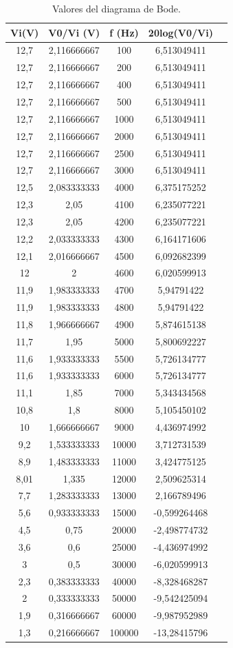 \documentclass[paper=a4, fontsize=11pt]{scrartcl} %
\numberwithin{equation}{section} %
\numberwithin{figure}{section} %
\numberwithin{table}{section} %
\begin{document}
\begin{table}[H]
	\centering
	\begin{tabular}{|c|c|c|c|c|}
		\hline
		\textbf{Vi(V)} & \textbf{V0/Vi (V)} & \textbf{f (Hz)} & \textbf{20log(V0/Vi)} \\
		\hline 
		12,7&2,116666667&100&6,513049411\\
		12,7&2,116666667&200&6,513049411\\
		12,7&2,116666667&400&6,513049411\\
		12,7&2,116666667&500&6,513049411\\
		12,7&2,116666667&1000&6,513049411\\
		12,7&2,116666667&2000&6,513049411\\
		12,7&2,116666667&2500&6,513049411\\
		12,7&2,116666667&3000&6,513049411\\
		12,5&2,083333333&4000&6,375175252\\
		12,3&2,05&4100&6,235077221\\
		12,3&2,05&4200&6,235077221\\
		12,2&2,033333333&4300&6,164171606\\
		12,1&2,016666667&4500&6,092682399\\
		12&2&4600&6,020599913\\
		11,9&1,983333333&4700&5,94791422\\
		11,9&1,983333333&4800&5,94791422\\
		11,8&1,966666667&4900&5,874615138\\
		11,7&1,95&5000&5,800692227\\
		11,6&1,933333333&5500&5,726134777\\
		11,6&1,933333333&6000&5,726134777\\
		11,1&1,85&7000&5,343434568\\
		10,8&1,8&8000&5,105450102\\
		10&1,666666667&9000&4,436974992\\
		9,2&1,533333333&10000&3,712731539\\
		8,9&1,483333333&11000&3,424775125\\
		8,01&1,335&12000&2,509625314\\
		7,7&1,283333333&13000&2,166789496\\
		5,6&0,933333333&15000&-0,599264468\\
		4,5&0,75&20000&-2,498774732\\
		3,6&0,6&25000&-4,436974992\\
		3&0,5&30000&-6,020599913\\
		2,3&0,383333333&40000&-8,328468287\\
		2&0,333333333&50000&-9,542425094\\
		1,9&0,316666667&60000&-9,987952989\\
		1,3&0,216666667&100000&-13,28415796\\
	
		\hline			
	\end{tabular}
	\caption{Valores del diagrama de Bode.} \label{Bode}
\end{table}
\end{document}
